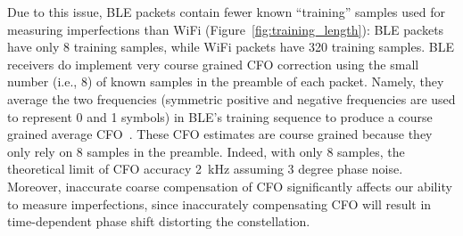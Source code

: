 Due to this issue, BLE packets contain fewer
known ``training'' samples used for measuring imperfections than WiFi
(Figure~\ref{fig:training_length}): BLE packets have only 8 training samples,
while WiFi packets have 320 training samples.
%
BLE receivers do implement very course grained CFO correction using the small
number (i.e., 8) of known samples in the preamble of each packet.
%
Namely, they average the two frequencies (symmetric positive and negative
frequencies are used to represent 0 and 1 symbols) in BLE's training
sequence to produce a course grained average CFO~\cite{cvtracksun}.
%
%
These CFO estimates are course grained because they only rely on 8 samples in the preamble.
%
Indeed, with only 8 samples, the theoretical limit of CFO accuracy 2~kHz
assuming 3 degree phase noise. Moreover, inaccurate coarse compensation of CFO significantly affects our ability to measure \iq imperfections, since inaccurately compensating CFO will result in time-dependent phase shift distorting the \iq constellation.
%






